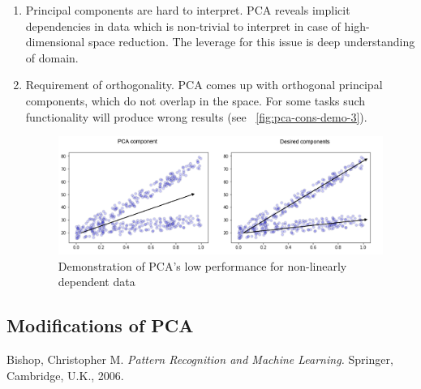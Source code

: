 \begin{enumerate}
	\item Principal components are hard to interpret.
	PCA reveals implicit dependencies in data which is non-trivial to interpret in case of high-dimensional space reduction. The leverage for this issue is deep understanding of domain.
	
	\item Requirement of orthogonality.
	PCA comes up with orthogonal principal components, which do not overlap in the space. For some tasks such functionality will produce wrong results (see ~\autoref{fig:pca-cons-demo-3}).
	
	\begin{figure}
		\centering
		\includegraphics[scale=0.5]{img/non-orthogonal-components.png}
		\caption{\label{fig:pca-cons-demo-3}Demonstration of PCA's low performance for non-linearly dependent data}
	\end{figure}
	
\end{enumerate}

\subsection{Modifications of PCA}

\begin{thebibliography}{9}

	Bishop, Christopher M.
	\textit{Pattern Recognition
	and Machine Learning.} Springer, Cambridge, U.K., 2006.
	
\end{thebibliography}

